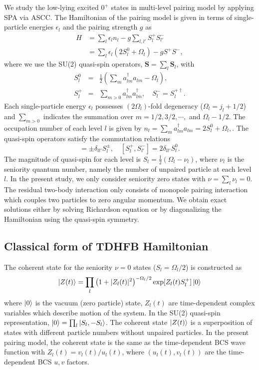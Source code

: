 \documentclass[%
superscriptaddress,
showpacs,
nofootinbib,
amsmath,amssymb,
aps,
prc,
twocolumn,
floatfix ]%
{revtex4-1}
\begin{document}
We study the low-lying excited $0^+$ states in multi-level pairing model by applying SPA via ASCC. 
The Hamiltonian of the pairing model is given in terms of
single-particle energies $\epsilon_l$ and the pairing strength $g$ as
\begin{align}
	H &= \sum_l \epsilon_l n_l - g \sum_{l,l'} S_l^+ S_{l'}^- \nonumber \\
    &= \sum_l\epsilon_l(2S_l^0+\Omega_l) - g S^+ S^{-} ,
\end{align}
where we use the SU(2) quasi-spin operators,
$\boldsymbol{S}=\sum_l \boldsymbol{S}_l$, with
\begin{eqnarray}
        S_l^0 &=& \frac{1}{2}(\sum_ma_{lm}^{\dag}a_{lm}-\Omega_l) ,\\
        S_l^{+} &=& \sum_{m>0}a_{lm}^{\dag}a_{l\overline{m}}^{\dag} ,
\quad   S_l^{-} = S_l^{+\dag} .
\end{eqnarray}
Each single-particle energy $\epsilon_l$ possesses $(2\Omega_l)$-fold
degeneracy ($\Omega_l=j_l+1/2$)
and $\sum_{m>0}$ indicates the summation over $m=1/2,3/2,\cdots,$ and $\Omega_l-1/2$.
The occupation number of each level $l$ is given by
$
	n_l = \sum_m a^{\dag}_{lm}a_{lm} = 2S_l^0+\Omega_l ,
$.
The quasi-spin operators satisfy the commutation relations
\begin{equation}
  [S_l^0,S_{l'}^{\pm}] = \pm\delta_{ll'}S_{l}^{\pm},
	\quad [S_{l}^{+},S_{l'}^{-}] = 2\delta_{ll'}S_{l}^{0} .
\end{equation}
The magnitude of quasi-spin for each level is
$S_l=\frac{1}{2}(\Omega_l-\nu_l)$, where $\nu_l$ is the seniority
quantum number, namely the number of unpaired particle at each level $l$.
In the present study, we only consider seniority zero states with
$\nu=\sum_l \nu_l=0$.
The residual two-body interaction only consists of monopole pairing
interaction which couples two particles to zero angular momentum.
We obtain exact solutions either by solving Richardson equation
\cite{Richardson,Richardson2,Richardson3} or
by diagonalizing the Hamiltonian using the quasi-spin symmetry.

\subsection{Classical form of TDHFB Hamiltonian}
The coherent state for the seniority $\nu=0$ states
($S_l=\Omega_l/2$) is constructed as
\begin{equation}
	\ket{Z(t)} = \prod_{l} \left(1+|Z_l(t)|^2\right)^{-\Omega_l/2}
	\exp [Z_l(t) S_l^{+}] \ket{0}
 \label{coherent}
\end{equation}
where $\ket{0}$ is the vacuum (zero particle) state,
$Z_l(t)$ are time-dependent complex variables which describe
motion of the system. 
In the SU(2) quasi-spin representation,
$\ket{0}=\prod_l \ket{S_l,-S_l}$.
The coherent state $\ket{Z(t)}$ is a superposition of
states with different particle numbers
without unpaired particles.
In the present pairing model,
the coherent state is the same as the time-dependent BCS wave function
with $Z_l(t)=v_l(t)/u_l(t)$,
where $(u_l(t),v_l(t))$ are the time-dependent BCS $u,v$ factors.
\end{document}
